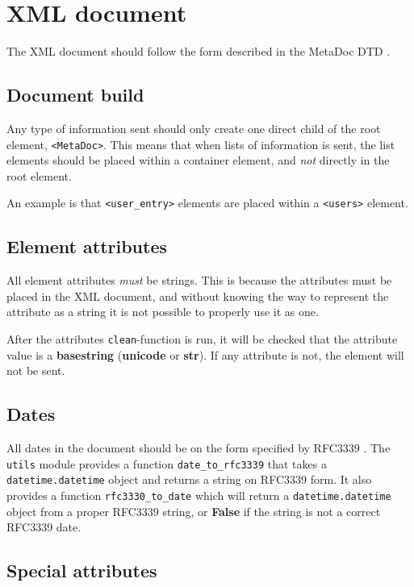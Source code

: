 \newpage
\section{XML document}
\label{sec:xmldoc}

The XML document should follow the form described in the MetaDoc DTD 
\cite{metadoc_dtd}. 

\subsection{Document build}

Any type of information sent should only create one direct child of the root
element, \texttt{<MetaDoc>}. This means that when lists of information is sent, 
the list elements should be placed within a container element, and \textit{not} 
directly in the root element.

An example is that \texttt{<user\_entry>} elements are placed within a
\texttt{<users>} element. 

\subsection{Element attributes}

All element attributes \textit{must} be strings. This is because the attributes 
must be placed in the XML document, and without knowing the way to represent the 
attribute as a string it is not possible to properly use it as one.

After the attributes \texttt{clean}-function is run, it will be checked that
the attribute value is a \textbf{basestring} (\textbf{unicode} or
\textbf{str}). If any attribute is not, the element will not be sent. 

\subsection{Dates}

All dates in the document should be on the form specified by RFC3339 
\cite{rfc3339}. The \texttt{utils} module provides a function 
\texttt{date\_to\_rfc3339} that takes a \texttt{datetime.datetime} object and 
returns a string on RFC3339 form. It also provides a function
\texttt{rfc3330\_to\_date} which will return a \texttt{datetime.datetime}
object from a proper RFC3339 string, or \textbf{False} if the string is not a
correct RFC3339 date.

\subsection{Special attributes}

